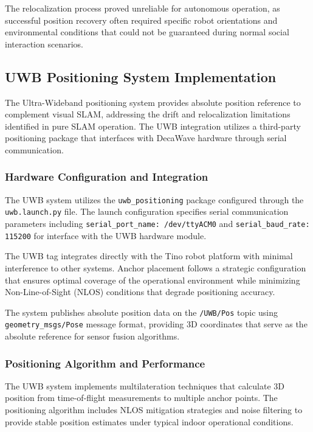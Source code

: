 The relocalization process proved unreliable for autonomous operation, as successful position recovery often required specific robot orientations and environmental conditions that could not be guaranteed during normal social interaction scenarios.

\subsection{UWB Positioning System Implementation}

The Ultra-Wideband positioning system provides absolute position reference to complement visual SLAM, addressing the drift and relocalization limitations identified in pure SLAM operation. The UWB integration utilizes a third-party positioning package that interfaces with DecaWave hardware through serial communication.

\subsubsection{Hardware Configuration and Integration}

The UWB system utilizes the \texttt{uwb\_positioning} package configured through the \texttt{uwb.launch.py} file. The launch configuration specifies serial communication parameters including \texttt{serial\_port\_name: /dev/ttyACM0} and \texttt{serial\_baud\_rate: 115200} for interface with the UWB hardware module.

The UWB tag integrates directly with the Tino robot platform with minimal interference to other systems. Anchor placement follows a strategic configuration that ensures optimal coverage of the operational environment while minimizing Non-Line-of-Sight (NLOS) conditions that degrade positioning accuracy.

The system publishes absolute position data on the \texttt{/UWB/Pos} topic using \texttt{geometry\_msgs/Pose} message format, providing 3D coordinates that serve as the absolute reference for sensor fusion algorithms.

\subsubsection{Positioning Algorithm and Performance}

The UWB system implements multilateration techniques that calculate 3D position from time-of-flight measurements to multiple anchor points. The positioning algorithm includes NLOS mitigation strategies and noise filtering to provide stable position estimates under typical indoor operational conditions.

